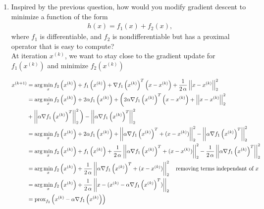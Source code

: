 \documentclass[12pt,twoside]{article}
\begin{document}
\begin{enumerate}
\begin{enumerate}
\item 
Inspired by the previous question, how would you modify gradient descent to minimize a function of the form
\begin{align}
h(x) = f_1(x) + f_2(x),
\end{align}
where $f_1$ is differentiable, and $f_2$ is nondifferentiable but has a proximal operator that is easy to compute?\\
At iteration $x^{(k)}$, we want to stay close to the gradient update for $f_1(x^{(k)})$ and minimize $f_2(x^{(k)})$

\begin{align*}
   x^{(k+1)}  	&=  \arg \min_{x}  f_2\left( x^{(k)} \right) + f_1\left( x^{(k)} \right) + \nabla f_1\left( x^{(k)} \right)^T\left( x-x^{(k)} \right) +  \frac{1}{2 \, \alpha } \left|\left| x-x^{(k)} \right|\right| _{2}^2 \\
			&=   \arg \min_{x}  f_2\left( x^{(k)} \right) + 2 \alpha  f_1\left( x^{(k)} \right) + \bigg( 2 \alpha \nabla f_1\left( x^{(k)} \right)^T\left( x-x^{(k)} \right) + \left|\left| x-x^{(k)} \right|\right| _{2}^2  \\
			&+  \left|\left| \alpha  \nabla f_1\left( x^{(k)} \right)^T \right|\right| _{2}^2 \bigg) -  \left|\left| \alpha  \nabla f_1\left( x^{(k)} \right)^T \right|\right| _{2}^2 \\
			&=  \arg \min_{x}  f_2\left( x^{(k)} \right) + 2 \alpha  f_1\left( x^{(k)} \right) +  \left|\left| \alpha  \nabla f_1\left( x^{(k)} \right)^T +  (x-x^{(k)})  \right|\right| _{2}^2 -  \left|\left| \alpha  \nabla f_1\left( x^{(k)} \right)^T \right|\right| _{2}^2 \\
			&=  \arg \min_{x}  f_2\left( x^{(k)} \right) + f_1\left( x^{(k)} \right) +  \frac{1}{2 \, \alpha }   \left|\left| \alpha  \nabla f_1\left( x^{(k)} \right)^T +  (x-x^{(k)})  \right|\right| _{2}^2 -  
			\frac{1}{2 \, \alpha }    \left|\left| \alpha  \nabla f_1\left( x^{(k)} \right)^T \right|\right| _{2}^2 \\
			&=   \arg \min_{x}  f_2\left( x^{(k)} \right) +   \frac{1}{2 \, \alpha }   \left|\left| \alpha  \nabla f_1\left( x^{(k)} \right)^T +  (x-x^{(k)})  \right|\right| _{2}^2 \text{ ~ removing terms independant of } x\\
			&=   \arg \min_{x}  f_2\left( x^{(k)} \right) +   \frac{1}{2 \, \alpha }   \left|\left| x - (x^{(k)} - \alpha  \nabla f_1\left( x^{(k)} \right)^T ) \right|\right| _{2} \\
			 &= \operatorname{prox}_{f_2}\left( x^{(k)} - \alpha \nabla f_1\left( x^{(k)} \right) \right) \\
\end{align*}


\end{enumerate}
\end{enumerate}
\end{document}
